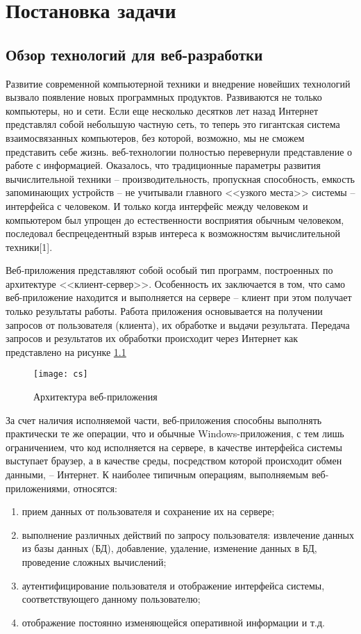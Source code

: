 \chapter{Постановка задачи}



\section{Обзор технологий для веб-разработки}

Развитие современной компьютерной техники и внедрение новейших технологий вызвало появление новых программных продуктов. 
Развиваются не только компьютеры, но и сети. Если еще несколько десятков лет назад Интернет представлял собой небольшую частную сеть, то теперь это гигантская система взаимосвязанных компьютеров, без которой, возможно, мы не сможем представить себе жизнь.
веб-технологии полностью перевернули представление о работе с информацией. Оказалось, что традиционные параметры развития вычислительной техники -- производительность, пропускная способность, емкость запоминающих устройств -- не учитывали главного <<узкого места>> системы -- интерфейса с человеком. И только когда интерфейс между человеком и компьютером был упрощен до естественности восприятия обычным человеком, последовал беспрецедентный взрыв интереса к возможностям вычислительной техники[1].

Веб-приложения представляют собой особый тип программ, построенных по архитектуре <<клиент-сервер>>. Особенность их заключается в том, что само веб-приложение находится и выполняется на сервере -- клиент при этом получает только результаты работы. Работа приложения основывается на получении запросов от пользователя (клиента), их обработке и выдачи результата. Передача запросов и результатов их обработки происходит через Интернет как представлено на рисунке \ref{web}

\begin{figure}[ht]
\center\texttt{[image: cs]}
\caption{Архитектура веб-приложения}\label{web}
\end{figure}

За счет наличия исполняемой части, веб-приложения способны выполнять практически те же операции, что и обычные Windows-приложения, с тем лишь ограничением, что код исполняется на сервере, в качестве интерфейса системы выступает браузер, а в качестве среды, посредством которой происходит обмен данными, -- Интернет. К наиболее типичным операциям, выполняемым веб-приложениями, относятся:
\begin{enumerate}
\item прием данных от пользователя и сохранение их на сервере;
\item выполнение различных действий по запросу пользователя: извлечение данных из базы данных (БД), добавление, удаление, изменение данных в БД, проведение сложных вычислений;
\item аутентифицирование пользователя и отображение интерфейса системы, соответствующего данному пользователю;
\item отображение постоянно изменяющейся оперативной информации и т.д.
\end{enumerate}

